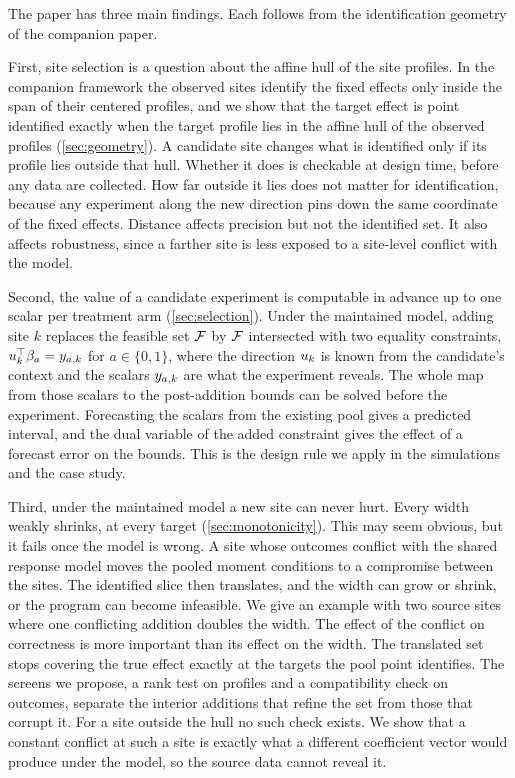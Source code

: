 The paper has three main findings. Each follows from the identification
geometry of the companion paper.

First, site selection is a question about the affine hull of the site
profiles. In the companion framework the observed sites identify the
fixed effects only inside the span of their centered profiles, and we
show that the target effect is point identified exactly when the target
profile lies in the affine hull of the observed profiles
(\cref{sec:geometry}). A candidate site changes what is identified only if its profile lies
outside that hull. Whether it does is checkable at design time, before
any data are collected. How far outside it lies does not matter for
identification, because any experiment along the new direction pins down
the same coordinate of the fixed effects. Distance affects precision but
not the identified set. It also affects robustness, since a farther site
is less exposed to a site-level conflict with the model.

Second, the value of a candidate experiment is computable in advance up
to one scalar per treatment arm (\cref{sec:selection}). Under the
maintained model, adding site $k$ replaces the feasible set
$\mathcal F$ by $\mathcal F$ intersected with two equality constraints,
$u_{k}^\top\beta_a=y_{a,k}$ for $a\in\{0,1\}$, where the
direction $u_{k}$ is known from the candidate's context and the
scalars $y_{a,k}$ are what the experiment reveals. The whole map
from those scalars to the post-addition bounds can be solved before the
experiment. Forecasting the scalars from the existing pool gives a predicted
interval, and the dual variable of the added constraint gives the effect
of a forecast error on the bounds. This is the design rule we apply in
the simulations and the case study.

Third, under the maintained model a new site can never hurt. Every width
weakly shrinks, at every target (\cref{sec:monotonicity}). This may seem
obvious, but it fails once the model is wrong. A site whose outcomes
conflict with the shared response model moves the pooled moment
conditions to a compromise between the sites. The identified slice then
translates, and the width can grow or shrink, or the program can become
infeasible. We
give an example with two source sites where one conflicting addition
doubles the width. The effect of the conflict on correctness is more important than its
effect on the width. The translated set stops covering the true effect
exactly at the targets the pool point identifies. The screens we
propose, a rank test on profiles and a compatibility check on outcomes,
separate the interior additions that refine the set from those that
corrupt it. For a site outside the hull no such check exists. We show
that a constant conflict at such a site is exactly what a different
coefficient vector would produce under the model, so the source data
cannot reveal it.

